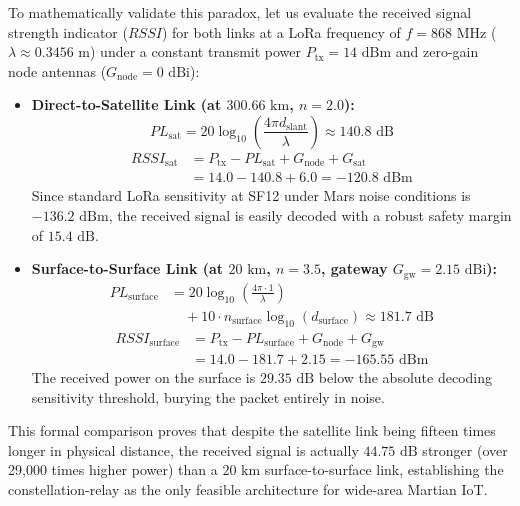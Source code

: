 \documentclass{ijuc}
\begin{document}
To mathematically validate this paradox, let us evaluate the received signal strength indicator ($RSSI$) for both links at a LoRa frequency of $f = 868\text{ MHz}$ ($\lambda \approx 0.3456\text{ m}$) under a constant transmit power $P_{\text{tx}} = 14\text{ dBm}$ and zero-gain node antennas ($G_{\text{node}} = 0\text{ dBi}$):
\begin{itemize}
    \item \textbf{Direct-to-Satellite Link (at $300.66\text{ km}$, $n=2.0$):}
    \begin{equation}
        PL_{\text{sat}} = 20\log_{10}\left(\frac{4\pi d_{\text{slant}}}{\lambda}\right) \approx 140.8\text{ dB}
    \end{equation}
    \begin{equation}
    \begin{split}
        RSSI_{\text{sat}} &= P_{\text{tx}} - PL_{\text{sat}} + G_{\text{node}} + G_{\text{sat}} \\
        &= 14.0 - 140.8 + 6.0 = -120.8\text{ dBm}
    \end{split}
    \end{equation}
    Since standard LoRa sensitivity at SF12 under Mars noise conditions is $-136.2\text{ dBm}$, the received signal is easily decoded with a robust safety margin of $15.4\text{ dB}$.
    \item \textbf{Surface-to-Surface Link (at $20\text{ km}$, $n=3.5$, gateway $G_{\text{gw}} = 2.15\text{ dBi}$):}
    \begin{equation}
    \begin{split}
        PL_{\text{surface}} &= 20\log_{10}\left(\frac{4\pi \cdot 1}{\lambda}\right) \\
        &\quad + 10 \cdot n_{\text{surface}} \log_{10}(d_{\text{surface}}) \approx 181.7\text{ dB}
    \end{split}
    \end{equation}
    \begin{equation}
    \begin{split}
        RSSI_{\text{surface}} &= P_{\text{tx}} - PL_{\text{surface}} + G_{\text{node}} + G_{\text{gw}} \\
        &= 14.0 - 181.7 + 2.15 = -165.55\text{ dBm}
    \end{split}
    \end{equation}
    The received power on the surface is $29.35\text{ dB}$ below the absolute decoding sensitivity threshold, burying the packet entirely in noise.
\end{itemize}
This formal comparison proves that despite the satellite link being fifteen times longer in physical distance, the received signal is actually $44.75\text{ dB}$ stronger (over 29,000 times higher power) than a $20\text{ km}$ surface-to-surface link, establishing the constellation-relay as the only feasible architecture for wide-area Martian IoT.
\end{document}
